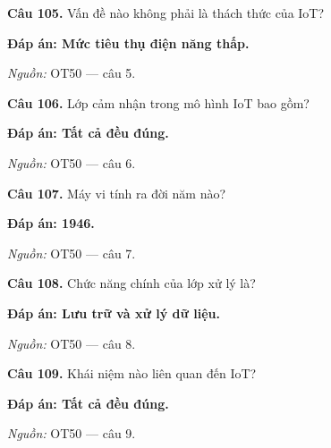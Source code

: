 \documentclass[11pt,a4paper]{article}
\begin{document}
\textbf{Câu 105.} Vấn đề nào không phải là thách thức của IoT?\par
{\color{answer}\textbf{Đáp án: Mức tiêu thụ điện năng thấp.}}\par
{\footnotesize\color{sourcegray}\textit{Nguồn:} OT50 — câu 5.\par}
\vspace{3pt}\par\noindent{\color{black!18}\rule{\linewidth}{0.3pt}}\par\medskip

\textbf{Câu 106.} Lớp cảm nhận trong mô hình IoT bao gồm?\par
{\color{answer}\textbf{Đáp án: Tất cả đều đúng.}}\par
{\footnotesize\color{sourcegray}\textit{Nguồn:} OT50 — câu 6.\par}
\vspace{3pt}\par\noindent{\color{black!18}\rule{\linewidth}{0.3pt}}\par\medskip

\textbf{Câu 107.} Máy vi tính ra đời năm nào?\par
{\color{answer}\textbf{Đáp án: 1946.}}\par
{\footnotesize\color{sourcegray}\textit{Nguồn:} OT50 — câu 7.\par}
\vspace{3pt}\par\noindent{\color{black!18}\rule{\linewidth}{0.3pt}}\par\medskip

\textbf{Câu 108.} Chức năng chính của lớp xử lý là?\par
{\color{answer}\textbf{Đáp án: Lưu trữ và xử lý dữ liệu.}}\par
{\footnotesize\color{sourcegray}\textit{Nguồn:} OT50 — câu 8.\par}
\vspace{3pt}\par\noindent{\color{black!18}\rule{\linewidth}{0.3pt}}\par\medskip

\textbf{Câu 109.} Khái niệm nào liên quan đến IoT?\par
{\color{answer}\textbf{Đáp án: Tất cả đều đúng.}}\par
{\footnotesize\color{sourcegray}\textit{Nguồn:} OT50 — câu 9.\par}
\vspace{3pt}\par\noindent{\color{black!18}\rule{\linewidth}{0.3pt}}\par\medskip
\end{document}
